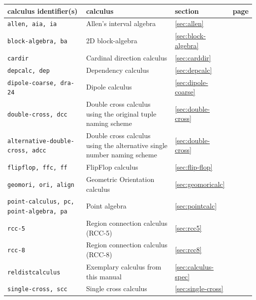 \documentclass[headsepline]{scrreprt}
\theoremstyle{definition}
\begin{document}
\renewcommand{\arraystretch}{1.5}
\begin{center}
\begin{longtable}{|p{4cm}p{6cm}ll|}\hline
	{\bf calculus identifier(s)} & {\bf calculus} & {\bf section} & {\bf page}\\ \hline \hline
%
	{\tt allen, aia, ia} & Allen's interval algebra \citep{allen83} & \ref{sec:allen} & \pageref{sec:allen} \\
	{\tt block-algebra, ba} & 2D block-algebra \citep{guesgen:89} & \ref{sec:block-algebra} & \pageref{sec:block-algebra} \\
	{\tt cardir} & Cardinal direction calculus \citep{ligozat98_carddir}  & \ref{sec:carddir} & \pageref{sec:carddir} \\
	{\tt depcalc, dep} & Dependency calculus \citep{Ragni05_DepCalc} & \ref{sec:depcalc} & \pageref{sec:depcalc} \\
	{\tt dipole-coarse, dra-24} & Dipole calculus \citep{moratz-renz-wolter-ECAI:00} & \ref{sec:dipole-coarse} & \pageref{sec:dipole-coarse} \\
	{\tt double-cross, dcc} & Double cross calculus \citep{cosyfre92} using the original tuple naming scheme & \ref{sec:double-cross} & \pageref{sec:double-cross} \\
	{\tt alternative-double- cross, adcc} & Double cross calculus \citep{cosyfre92} using the alternative single number naming scheme & \ref{sec:double-cross} & \pageref{sec:double-cross} \\
	{\tt flipflop, ffc, ff} & FlipFlop calculus \citep{Ligozat93_FlipFlopCalculus}& \ref{sec:flip-flop} & \pageref{sec:flip-flop} \\
	{\tt geomori, ori, align} & Geometric Orientation calculus & \ref{sec:geomoricalc} & \pageref{sec:geomoricalc} \\
	{\tt point-calculus, pc, point-algebra, pa} & Point algebra \citep{vilain_kautz_beek_89_constraint} & \ref{sec:pointcalc} & \pageref{sec:pointcalc} \\
	{\tt rcc-5} & Region connection calculus (RCC-5) \citep{randell92_rccb} & \ref{sec:rcc5} & \pageref{sec:rcc5} \\
	{\tt rcc-8} & Region connection calculus (RCC-8) \citep{randell92_rccb} & \ref{sec:rcc8} & \pageref{sec:rcc8} \\
	{\tt reldistcalculus} & Exemplary calculus from this manual & \ref{sec:calculus-spec} & \pageref{sec:calculus-spec}\\
	{\tt single-cross, scc} & Single cross calculus \citep{cosyfre92} & \ref{sec:single-cross} & \pageref{sec:single-cross} \\

\end{longtable}
\end{center}
\end{document}
